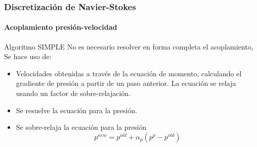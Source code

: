 \begin{frame}
    \frametitle{Discretizaci\'on de Navier-Stokes}
    \framesubtitle{Acoplamiento presi\'on-velocidad}
    
    \begin{block}{Algoritmo SIMPLE}
        No es necesario resolver en forma completa el acoplamiento, Se hace uso de:
        \begin{itemize}
            \item Velocidades obtenidas a trav\'es de la ecuaci\'on de momento, calculando el gradiente de presi\'on a partir de un paso anterior. La ecuaci\'on se relaja usando un factor de sobre-relajaci\'on.
            \item Se resuelve la ecuaci\'on para la presi\'on.
            \item Se sobre-relaja la ecuaci\'on para la presi\'on
            $$
            p^{new} = p^{old} + \alpha_p(p^{p}-p^{old})
            $$
        \end{itemize}
    \end{block}     

\end{frame} 
